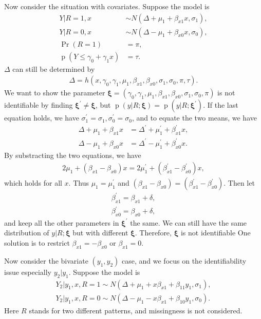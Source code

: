 \documentclass[12pt]{article}
\DeclareMathOperator{\pr}{p}
\DeclareMathOperator{\prob}{Pr}
\begin{document}
Now consider the situation with covariates. Suppose the model is
\begin{align*}
  Y | R = 1, x & \sim N(\Delta + \mu_1 + \beta_{x1} x, \sigma_1),\\
  Y | R = 0, x & \sim N(\Delta - \mu_1 + \beta_{x0} x, \sigma_0),\\
  \prob (R = 1) & = \pi,\\
  \pr (Y \leq \gamma_0 + \gamma_1 x ) & = \tau.
\end{align*}
$\Delta$ can still be determined by
\begin{align*}
  \Delta = h(x, \gamma_0, \gamma_1, \mu_1, \beta_{x1}, \beta_{x0},
  \sigma_1, \sigma_0, \pi, \tau).
\end{align*}
We want to show the parameter $\bm \xi = (\gamma_0, \gamma_1, \mu_1,
\beta_{x1}, \beta_{x0}, \sigma_1, \sigma_0, \pi )$ is not identifiable
by finding $\bm \xi^{'} \neq \bm \xi$, but $\pr (y | R; \bm \xi) = \pr
(y | R; \bm \xi^{'})$. If the last equation holds, we have
$\sigma_1^{'} = \sigma_1, \sigma_0^{'} = \sigma_0$, and to equate the
two means, we have
\begin{align*}
  \Delta + \mu_1 + \beta_{x1} x & = \Delta^{'} + \mu_1^{'} + \beta_{x1}^{'}x,\\
  \Delta - \mu_1 + \beta_{x0} x & = \Delta^{'} - \mu_1^{'} +
  \beta_{x0}^{'}x.
\end{align*}
By substracting the two equations, we have
\begin{align*}
  2\mu_1 + (\beta_{x1} - \beta_{x0}) x = 2\mu_1^{'} + (\beta_{x1}^{'}
  - \beta_{x0}^{'}) x,
\end{align*}
which holds for all $x$. Thus $\mu_1 = \mu_1^{'}$ and $(\beta_{x1} -
\beta_{x0}) = (\beta_{x1}^{'} - \beta_{x0}^{'})$. Then let
\begin{align*}
  \beta_{x1}^{'} =  \beta_{x1} + \delta, \\
  \beta_{x0}^{'} = \beta_{x0} + \delta,
\end{align*}
and keep all the other parameters in $\bm \xi^{'}$ the same. We can
still have the same distribution of $y|R; \bm \xi$ but with different
$\bm \xi$. Therefore, $\bm \xi$ is not identifiable One solution is to
restrict $\beta_{x1} = - \beta_{x0}$ or $\beta_{x1} = 0$.

Now consider the bivariate $(y_1, y_2)$ case, and we focus on the
identifiability issue especially $y_2|y_1$. Suppose the model is
\begin{align*}
  Y_2 | y_1, x, R = 1 \sim N(\Delta + \mu_1 + x\beta_{x1} + \beta_{11}y_1, \sigma_1), \\
  Y_2 | y_1, x, R = 0 \sim N(\Delta - \mu_1 - x\beta_{x1} +
  \beta_{10}y_1, \sigma_0).
\end{align*}
Here $R$ stands for two different patterns, and missingness is not
considered.
\end{document}
